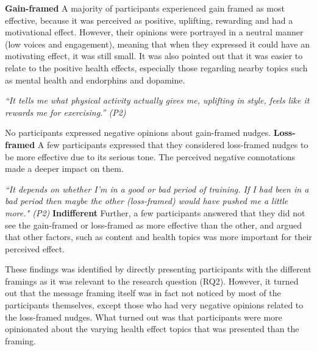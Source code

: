\bigbreak
\textbf{Gain-framed}
\bigbreak
A majority of participants experienced gain framed as most effective, because it was perceived as positive, uplifting, rewarding and had a motivational effect. However, their opinions were portrayed in a neutral manner (low voices and engagement), meaning that when they expressed it could have an motivating effect, it was still small. It was also pointed out that it was easier to relate to the positive health effects, especially those regarding nearby topics such as mental health and endorphins and dopamine. 

\textit{“It tells me what physical activity actually gives me, uplifting in style, feels like it rewards me for exercising.” (P2)}

 No participants expressed negative opinions about gain-framed nudges.
\bigbreak
\textbf{Loss-framed}
\bigbreak
A few participants expressed that they considered loss-framed nudges to be more effective due to its serious tone. The perceived negative connotations made a deeper impact on them. 

\textit{“It depends on whether I'm in a good or bad period of training. If I had been in a bad period then maybe the other (loss-framed) would have pushed me a little more." (P2)}
\bigbreak
\textbf{Indifferent}
\bigbreak
Further, a few participants answered that they did not see the gain-framed or loss-framed as more effective than  the other, and argued that other factors, such as content and health topics was more important for their perceived effect. 


These findings was identified by directly presenting participants with the different framings as it was relevant to the research question (RQ2). However, it turned out that the message framing itself was in fact not noticed by most of the participants themselves, except those who had very negative opinions related to the loss-framed nudges. What turned out was that participants were more opinionated about the varying health effect topics that was presented than the framing.

